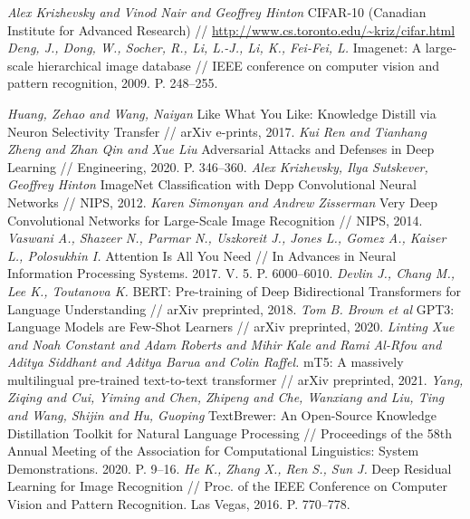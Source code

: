 \documentclass[12pt]{a&t}
\begin{document}
\begin{thebibliography}{10}
	\textit{Alex Krizhevsky and Vinod Nair and Geoffrey Hinton} CIFAR-10 (Canadian Institute for Advanced Research) // \url{http://www.cs.toronto.edu/~kriz/cifar.html}
	\textit{Deng, J., Dong, W., Socher, R., Li, L.-J., Li, K., Fei-Fei, L. } Imagenet: A large-scale hierarchical image database //  IEEE conference on computer vision and pattern recognition, 2009. P. 248--255. 
	
	\textit{{Huang}, Zehao and {Wang}, Naiyan} Like What You Like: Knowledge Distill via Neuron Selectivity Transfer // arXiv e-prints, 2017.
	\textit{Kui Ren and Tianhang Zheng and Zhan Qin and Xue Liu} Adversarial Attacks and Defenses in Deep Learning // Engineering, 2020. P. 346--360.
	\textit{Alex Krizhevsky, Ilya Sutskever, Geoffrey Hinton} ImageNet Classification with Depp Convolutional Neural Networks // NIPS, 2012.
	\textit{Karen Simonyan and Andrew Zisserman} Very Deep Convolutional Networks for Large-Scale Image Recognition // NIPS, 2014.
	\textit{Vaswani A., Shazeer N., Parmar N., Uszkoreit J., Jones L., Gomez A., Kaiser L., Polosukhin I.} Attention Is All You Need // In Advances in Neural Information Processing Systems. 2017. V. 5. P. 6000--6010.
       \textit{Devlin J., Chang M., Lee K., Toutanova K.} BERT: Pre-training of Deep Bidirectional Transformers for Language Understanding // arXiv preprinted, 2018.
        \textit{Tom B. Brown et al} GPT3: Language Models are Few-Shot Learners // arXiv preprinted, 2020.
        \textit{Linting Xue and Noah Constant and Adam Roberts and Mihir Kale and Rami Al-Rfou and Aditya Siddhant and Aditya Barua and Colin Raffel.} mT5: A massively multilingual pre-trained text-to-text transformer // arXiv preprinted, 2021.
        \textit{Yang, Ziqing and Cui, Yiming and Chen, Zhipeng and Che, Wanxiang and Liu, Ting and Wang, Shijin and Hu, Guoping} {T}ext{B}rewer: {A}n {O}pen-{S}ource {K}nowledge {D}istillation {T}oolkit for {N}atural {L}anguage {P}rocessing // Proceedings of the 58th Annual Meeting of the Association for Computational Linguistics: System Demonstrations.  2020. P. 9--16.
	\textit{He K., Zhang X., Ren S., Sun J.} Deep Residual Learning for Image Recognition // Proc. of the IEEE Conference on Computer Vision and Pattern Recognition. Las Vegas, 2016. P. 770--778.

\end{thebibliography}
\end{document}
